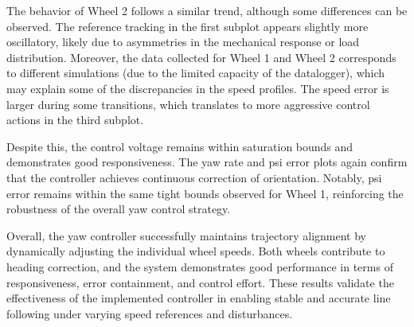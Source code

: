 The behavior of Wheel 2 follows a similar trend, although some differences can be observed. 
The reference tracking in the first subplot appears slightly more oscillatory, likely due to asymmetries in the mechanical response or load distribution. 
Moreover, the data collected for Wheel 1 and Wheel 2 corresponds to different simulations (due to the limited capacity of the datalogger), which may explain some of the discrepancies in the speed profiles.
The speed error is larger during some transitions, which translates to more aggressive control actions in the third subplot.

Despite this, the control voltage remains within saturation bounds and demonstrates good responsiveness. 
The yaw rate and psi error plots again confirm that the controller achieves continuous correction of orientation. 
Notably, psi error remains within the same tight bounds observed for Wheel 1, reinforcing the robustness of the overall yaw control strategy.

Overall, the yaw controller successfully maintains trajectory alignment by dynamically adjusting the individual wheel speeds. 
Both wheels contribute to heading correction, and the system demonstrates good performance in terms of responsiveness, error containment, and control effort. 
These results validate the effectiveness of the implemented controller in enabling stable and accurate line following under varying speed references and disturbances.